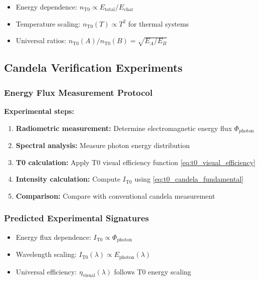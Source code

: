 \documentclass[12pt,a4paper]{article}
\newcommand{\Echar}{E_{\text{char}}}
\newcommand{\etavis}{\eta_{\text{visual}}}
\newcommand{\Phiphoton}{\Phi_{\text{photon}}}
\begin{document}
	\begin{itemize}
		\item Energy dependence: $n_{\text{T0}} \propto E_{\text{total}}/\Echar$
		\item Temperature scaling: $n_{\text{T0}}(T) \propto T^2$ for thermal systems
		\item Universal ratios: $n_{\text{T0}}(A)/n_{\text{T0}}(B) = \sqrt{E_A/E_B}$
	\end{itemize}
	
	\subsection{Candela Verification Experiments}
	\label{subsec:candela_verification}
	
	\subsubsection{Energy Flux Measurement Protocol}
	\label{subsubsec:candela_energy_protocol}
	
	\textbf{Experimental steps:}
	\begin{enumerate}
		\item \textbf{Radiometric measurement:} Determine electromagnetic energy flux $\Phiphoton$
		\item \textbf{Spectral analysis:} Measure photon energy distribution
		\item \textbf{T0 calculation:} Apply T0 visual efficiency function \cref{eq:t0_visual_efficiency}
		\item \textbf{Intensity calculation:} Compute $I_{\text{T0}}$ using \cref{eq:t0_candela_fundamental}
		\item \textbf{Comparison:} Compare with conventional candela measurement
	\end{enumerate}
	
	\subsubsection{Predicted Experimental Signatures}
	\label{subsubsec:candela_experimental_signatures}
	
	\begin{itemize}
		\item Energy flux dependence: $I_{\text{T0}} \propto \Phiphoton$
		\item Wavelength scaling: $I_{\text{T0}}(\lambda) \propto E_{\text{photon}}(\lambda)$
		\item Universal efficiency: $\etavis(\lambda)$ follows T0 energy scaling
	\end{itemize}
	
\end{document}
